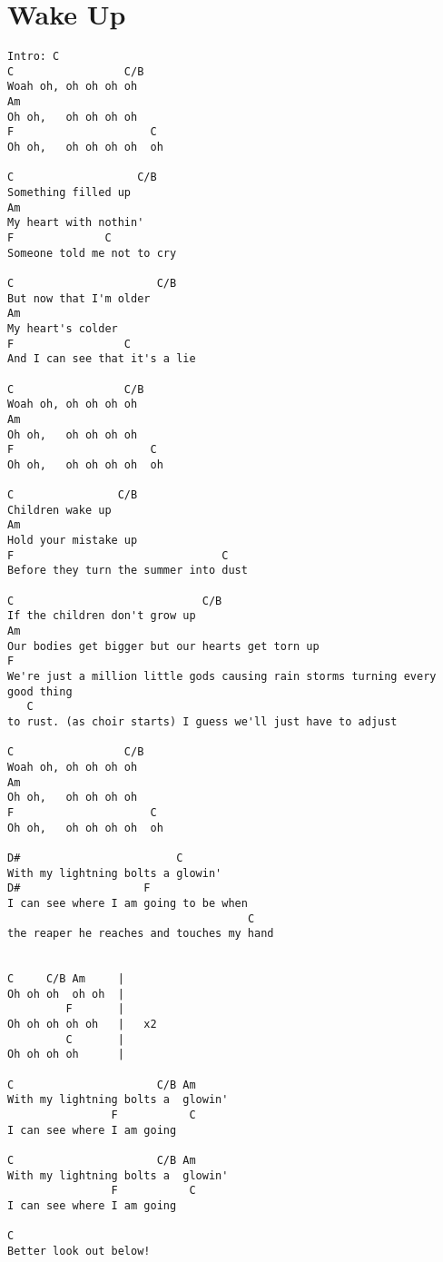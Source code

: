 \documentclass[leqno]{memoir}
\begin{document}
\chapter{Wake Up}
\begin{verbatim}
Intro: C
C                 C/B
Woah oh, oh oh oh oh
Am
Oh oh,   oh oh oh oh
F                     C
Oh oh,   oh oh oh oh  oh

C                   C/B
Something filled up
Am
My heart with nothin' 
F              C
Someone told me not to cry

C                      C/B
But now that I'm older
Am
My heart's colder
F                 C
And I can see that it's a lie

C                 C/B
Woah oh, oh oh oh oh
Am
Oh oh,   oh oh oh oh
F                     C
Oh oh,   oh oh oh oh  oh

C                C/B
Children wake up
Am
Hold your mistake up 
F                                C
Before they turn the summer into dust

C                             C/B
If the children don't grow up
Am
Our bodies get bigger but our hearts get torn up
F
We're just a million little gods causing rain storms turning every good thing 
   C
to rust. (as choir starts) I guess we'll just have to adjust  

C                 C/B
Woah oh, oh oh oh oh
Am
Oh oh,   oh oh oh oh
F                     C
Oh oh,   oh oh oh oh  oh

D#                        C
With my lightning bolts a glowin' 
D#                   F
I can see where I am going to be when
                                     C
the reaper he reaches and touches my hand
 

C     C/B Am     |
Oh oh oh  oh oh  |
         F       |
Oh oh oh oh oh   |   x2
         C       |
Oh oh oh oh      |

C                      C/B Am
With my lightning bolts a  glowin' 
                F           C
I can see where I am going 

C                      C/B Am
With my lightning bolts a  glowin' 
                F           C
I can see where I am going

C 
Better look out below!
\end{verbatim}
\newpage
\end{document}
